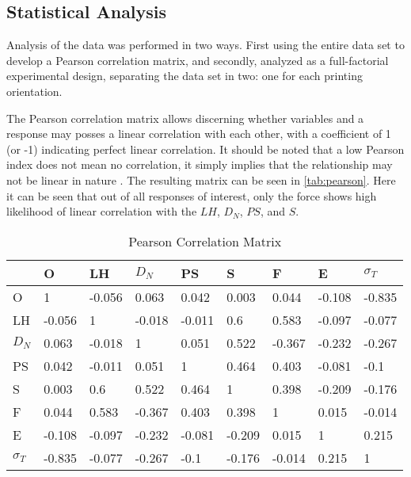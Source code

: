 \documentclass[main.tex]{subfiles}
\begin{document}

\subsection{Statistical Analysis}\label{ssec:fact}
Analysis of the data was performed in two ways. First using the entire data set to develop a Pearson correlation matrix, and secondly, analyzed as a full-factorial experimental design, separating the data set in  two: one for each printing orientation. 

The Pearson correlation matrix allows discerning whether variables and a response may posses a linear correlation with each other, with a coefficient of 1 (or -1) indicating perfect linear correlation. It should be noted that a low Pearson index does not mean no correlation, it simply implies that the relationship may not be linear in nature \cite{Geron2019}. The resulting matrix can be seen in \ref{tab:pearson}. Here it can be seen that out of all responses of interest, only the force shows high likelihood of linear correlation with the $LH$, $D_{N}$, $PS$, and $S$.

\begin{table}[!htbp]
	\renewcommand{\arraystretch}{1.5}
	\centering
	\caption{Pearson Correlation Matrix}
	\begin{tabular}{l|llllllll}
		\toprule
		& O      & LH     & $D_N$  & PS     & S      & F      & E      & $\sigma_{T}$ \\
		\midrule
		O            & 1      & -0.056 & 0.063  & 0.042  & 0.003  & 0.044  & -0.108 & -0.835       \\
		LH           & -0.056 & 1      & -0.018 & -0.011 & 0.6    & 0.583  & -0.097 & -0.077       \\
		$D_N$        & 0.063  & -0.018 & 1      & 0.051  & 0.522  & -0.367 & -0.232 & -0.267       \\
		PS           & 0.042  & -0.011 & 0.051  & 1      & 0.464  & 0.403  & -0.081 & -0.1         \\
		S            & 0.003  & 0.6    & 0.522  & 0.464  & 1      & 0.398  & -0.209 & -0.176       \\
		F            & 0.044  & 0.583  & -0.367 & 0.403  & 0.398  & 1      & 0.015  & -0.014       \\
		E            & -0.108 & -0.097 & -0.232 & -0.081 & -0.209 & 0.015  & 1      & 0.215        \\
		$\sigma_{T}$ & -0.835 & -0.077 & -0.267 & -0.1   & -0.176 & -0.014 & 0.215  & 1\\
		\bottomrule          
	\end{tabular}
\end{table} \label{tab:pearson}
\end{document}
